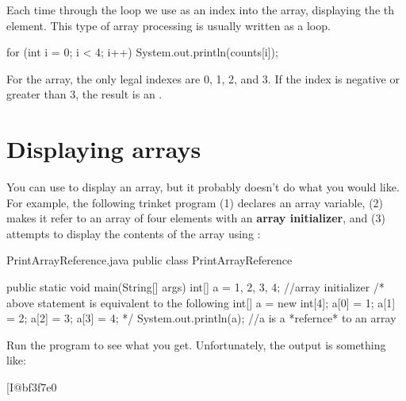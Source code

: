 
Each time through the loop we use  as an index into the array, displaying the th element.
This type of array processing is usually written as a  loop.

\begin{code}
for (int i = 0; i < 4; i++) {
    System.out.println(counts[i]);
}
\end{code}


For the  array, the only legal indexes are 0, 1, 2, and 3.
If the index is negative or greater than 3, the result is an .


\section{Displaying arrays}
\label{printarray}


You can use  to display an array, but it probably doesn't do what you would like.
For example, the following trinket program (1) declares an array variable, (2) makes it refer to an array of four elements with an \textbf{array initializer}, and (3) attempts to display the contents of the array using :
%

\begin{trinket} [230] {PrintArrayReference.java}
public class PrintArrayReference {

    public static void main(String[] args) {
       int[] a = {1, 2, 3, 4}; //array initializer
       /* above statement is equivalent to the following
       int[] a = new int[4];
       a[0] = 1;
       a[1] = 2;
       a[2] = 3;
       a[3] = 4;  */
       System.out.println(a);  //a is a *refernce* to an array
    }
}
\end{trinket}

Run the program to see what you get. Unfortunately, the output is something like:

\begin{stdout}
[I@bf3f7e0
\end{stdout}

